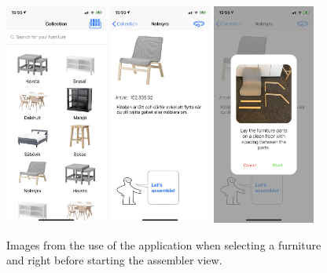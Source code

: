 \begin{figure}[!hbtp]
\begin{center}
\includegraphics[width = 0.3\textwidth]{./Images/Application1}
\includegraphics[width = 0.3\textwidth]{./Images/Application2}
\includegraphics[width = 0.3\textwidth]{./Images/Application3}
\caption{Images from the use of the application when selecting a furniture and right before starting the assembler view.}
\label{fig:applicationSelection}
\end{center}
\end{figure}

